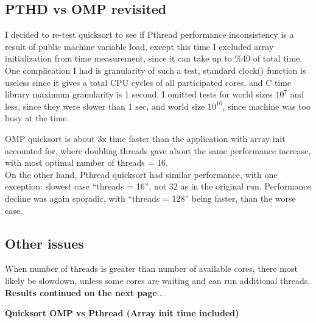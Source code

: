\documentclass{article}
\begin{document}
\subsection{\textbf{PTHD vs OMP revisited}}

I decided to re-test quicksort to see if Pthread performance inconsistency is a  
result of public machine variable load, except this time I excluded array initialization
from time measurement, since it can take up to \%40 of total time. One complication I had
is granularity of such a test, standard clock() function is useless since it gives a total
CPU cycles of all participated cores, and C time library maximum granularity is 1 second.
I omitted tests for world sizes $10^7$ and less, since they were slower than 1 sec, and world
size $10^{10}$, since machine was too busy at the time.

OMP quicksort is about 3x time faster than the application with array init accounted for, 
where doubling threads gave about the same performance increase, with most optimal  number of threads =
16.\\
On the other hand, Pthread quicksort had similar performance, with one exception: slowest
case ``threads = 16'', not 32 as in the original run.  Performance decline was again
sporadic, with ``threads = 128'' being faster, than the worse case. 

\subsection{\textbf{Other issues}} 
When number of threads is greater than number of available cores, there most likely be
slowdown, unless some cores are waiting and can run additional threads.\\

\textbf{Results continued on the next page$\dots$}

\pagebreak

\textbf{Quicksort OMP vs Pthread (Array init time included)}\\
\end{document}
